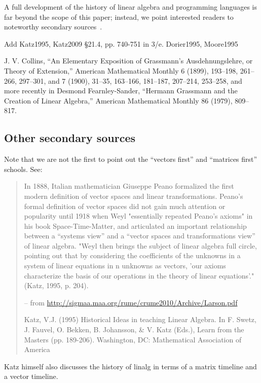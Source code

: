 A full development of the history of linear algebra and programming languages is
far beyond the scope of this paper; instead, we point interested readers to
noteworthy secondary sources~\cite{Parshall1985,Kleiner2007,Higham2009}.

Add Katz1995, Katz2009 \S 21.4, pp. 740-751 in 3/e.
Dorier1995, Moore1995

J. V. Collins, “An Elementary
Exposition of Grassmann’s Ausdehnungslehre, or Theory
of Extension,” American Mathematical Monthly 6
(1899), 193–198, 261–266, 297–301, and 7 (1900), 31–35,
163–166, 181–187, 207–214, 253–258, and more recently
in Desmond Fearnley-Sander, “Hermann Grassmann and
the Creation of Linear Algebra,” American Mathematical
Monthly 86 (1979), 809–817.

\subsection{Other secondary sources}


Note that we are not the first to point out the ``vectors first'' and ``matrices first'' schools.
See:

\begin{quote}
In 1888, Italian mathematician Giuseppe Peano formalized the first modern definition of
vector spaces and linear transformations. Peano's formal definition of vector spaces did not gain
much attention or popularity until 1918 when Weyl "essentially repeated Peano's axioms" in his 
book Space-Time-Matter, and articulated an important relationship between a “systems view”
and a “vector spaces and transformations view” of linear algebra. "Weyl then brings the subject
of linear algebra full circle, pointing out that by considering the coefficients of the unknowns in a
system of linear equations in n unknowns as vectors, 'our axioms characterize the basis of our
operations in the theory of linear equations'." (Katz, 1995, p. 204).

-- from \url{http://sigmaa.maa.org/rume/crume2010/Archive/Larson.pdf}

Katz, V.J. (1995) Historical Ideas in teaching Linear Algebra. In F. Swetz, J. Fauvel, O. Bekken,
B. Johansson, & V. Katz (Eds.), Learn from the Masters (pp. 189-206). Washington,
DC: Mathematical Association of America
\end{quote}

Katz himself also discusses the history of linalg in terms of a matrix timeline and a vector timeline.


